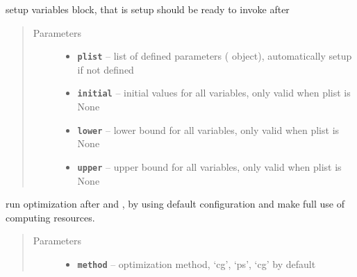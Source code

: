 \documentclass[letterpaper,10pt,english]{sphinxmanual}
\begin{document}
\begin{fulllineitems}
\begin{fulllineitems}
\begin{quote}
\begin{description}
\end{description}\end{quote}

\end{fulllineitems}


\begin{fulllineitems}
\label{src/apidocs/genopt:genopt.DakotaOC.set_variables}
setup variables block, that is setup 
should be ready to invoke after 
\begin{quote}\begin{description}
\item[{Parameters}] \leavevmode\begin{itemize}
\item {} 
\textbf{\texttt{plist}} -- list of defined parameters ( object), 
automatically setup if not defined

\item {} 
\textbf{\texttt{initial}} -- initial values for all variables, only valid when plist is None

\item {} 
\textbf{\texttt{lower}} -- lower bound for all variables, only valid when plist is None

\item {} 
\textbf{\texttt{upper}} -- upper bound for all variables, only valid when plist is None

\end{itemize}

\end{description}\end{quote}

\end{fulllineitems}


\begin{fulllineitems}
\label{src/apidocs/genopt:genopt.DakotaOC.simple_run}
run optimization after  and ,
by using default configuration and make full use of computing resources.
\begin{quote}\begin{description}
\item[{Parameters}] \leavevmode\begin{itemize}
\item {} 
\textbf{\texttt{method}} -- optimization method, `cg', `ps', `cg' by default


\end{itemize}
\end{description}
\end{quote}
\end{fulllineitems}
\end{fulllineitems}
\end{document}
